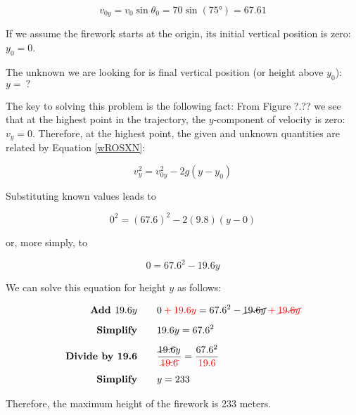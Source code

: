 \documentclass[main-physics.tex]{subfiles}
\begin{document}
\begin{equation*}
    v_{0y} = v_0 \sin{\theta_0} = 70 \sin{(\ang{75})} = 67.61
\end{equation*}

If we assume the firework starts at the origin, its initial vertical position is zero: $y_0 = 0$.

\vspace{1em}

The unknown we are looking for is final vertical position (or height above $y_0$): $y =\ ?$ 

\vspace{1em}

The key to solving this problem is the following fact: From Figure ?.?? we see that at the highest point in the trajectory, the $y$-component of velocity is zero: $v_y = 0$. Therefore, at the highest point, the given and unknown quantities are related by Equation \eqref{wROSXN}:

\begin{equation*}
    v_y^2 = v_{0y}^2 - 2 g \left(y-y_0\right)
\end{equation*}

Substituting known values leads to

\begin{equation*}
    0^2 = \left(67.6\right)^2 - 2 (9.8) \left(y - 0\right)
\end{equation*}

or, more simply, to

\begin{equation*}
    0 = 67.6^2 - 19.6 y
\end{equation*}

We can solve this equation for height $y$ as follows:

\begin{align*}
    \textbf{Add $19.6 y$} \qquad & 0 \mathbin{\color{red} +} \textcolor{red}{19.6 y} = 67.6^2 - \cancel{19.6 y} \mathbin{\color{red} +} \textcolor{red}{\cancel{19.6 y}}\\[1ex]
    \textbf{Simplify} \qquad & 19.6 y = 67.6^2\\[1ex]
    \textbf{Divide by 19.6} \qquad & \frac{\cancel{19.6} y}{\textcolor{red}{\cancel{19.6}}} = \frac{67.6^2}{\textcolor{red}{19.6}}\\[1ex]
    \textbf{Simplify} \qquad & y = 233
\end{align*}

Therefore, the maximum height of the firework is 233 meters.

\endsolution
\end{document}

